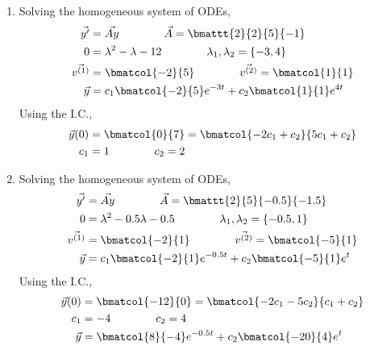 \begin{enumerate}
    \item Solving the homogeneous system of ODEs,
          \begin{align}
              \vec{y'}      & = \vec{Ay}
              \qquad\qquad
              \vec{A}                           = \bmattt{2}{2}{5}{-1}   \\
              0             & = \lambda^{2} - \lambda - 12
              \qquad\qquad
              \lambda_1, \lambda_2              = \left\{ -3, 4 \right\} \\
              \vec{v^{(1)}} & = \bmatcol{-2}{5}
              \qquad\qquad
              \vec{v^{(2)}} = \bmatcol{1}{1}                             \\
              \vec{y}       & = c_1 \bmatcol{-2}{5}e^{-3t}
              + c_2\bmatcol{1}{1}e^{4t}
          \end{align}
          Using the I.C.,
          \begin{align}
              \vec{y}(0) & = \bmatcol{0}{7} = \bmatcol{-2c_1 + c_2}{5c_1 + c_2} \\
              c_1        & = 1 \qquad\qquad c_2 = 2
          \end{align}

    \item Solving the homogeneous system of ODEs,
          \begin{align}
              \vec{y'}      & = \vec{Ay}
              \qquad\qquad
              \vec{A}                           = \bmattt{2}{5}{-0.5}{-1.5} \\
              0             & = \lambda^{2} - 0.5\lambda - 0.5
              \qquad\qquad
              \lambda_1, \lambda_2              = \left\{ -0.5, 1 \right\}  \\
              \vec{v^{(1)}} & = \bmatcol{-2}{1}
              \qquad\qquad
              \vec{v^{(2)}} = \bmatcol{-5}{1}                               \\
              \vec{y}       & = c_1 \bmatcol{-2}{1}e^{-0.5t}
              + c_2\bmatcol{-5}{1}e^{t}
          \end{align}
          Using the I.C.,
          \begin{align}
              \vec{y}(0) & = \bmatcol{-12}{0} = \bmatcol{-2c_1 - 5c_2}
              {c_1 + c_2}                                              \\
              c_1        & = -4 \qquad\qquad c_2 = 4                   \\
              \vec{y}    & = \bmatcol{8}{-4}e^{-0.5t}
              + c_2\bmatcol{-20}{4}e^{t}
          \end{align}


\end{enumerate}
